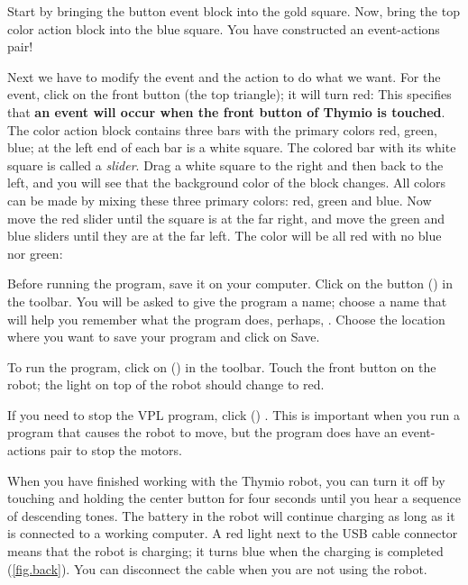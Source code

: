 Start by bringing the button event block  into the
gold square. Now, bring the top color action block
 into the blue square. You have constructed an
event-actions pair!

Next we have to modify the event and the action to do what we want. For
the event, click on the front button (the top triangle); it will turn
red:  This specifies that \textbf{an event will occur when
the front button of Thymio is touched}. The color action block contains
three bars with the primary colors red, green, blue; at the left end of
each bar is a white square. The colored bar with its white square is
called a \emph{slider}. Drag a white square to the right and then back
to the left, and you will see that the background color of the block
changes. All colors can be made by mixing these three primary colors:
red, green and blue. Now move the red slider until the square is at the
far right, and move the green and blue sliders until they are at the far
left. The color will be all red with no blue nor green: 


Before running the program, save it on your computer. Click on the
button  () in the toolbar. You will be asked to
give the program a name; choose a name that will help you remember what
the program does, perhaps, . Choose the location where
you want to save your program and click on Save.


To run the program, click on  () in the toolbar.
Touch the front button on the robot; the light on top of the robot
should change to red.


If you need to stop the VPL program, click  () .
This is important when you run a program that causes the robot to move,
but the program does have an event-actions pair to stop the motors.


When you have finished working with the Thymio robot, you can turn it
off by touching and holding the center button for four seconds until
you hear a sequence of descending tones. The battery in the robot will
continue charging as long as it is connected to a working computer. A
red light next to the USB cable connector means that the robot is
charging; it turns blue when the charging is completed (\cref{fig.back}).
You can disconnect the cable when you are not using the robot.

